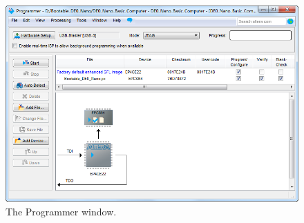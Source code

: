 \documentclass[11pt, twoside, pdftex]{article}
\newcommand{\commonPath}{../../Common}
\begin{document}
\begin{figure}[H]
   \begin{center}
        \includegraphics[scale=.5]{figures/programmer.png}
   \end{center}
   \caption{The Programmer window.}
	\label{fig:programmer}
\end{figure}



\end{document}
